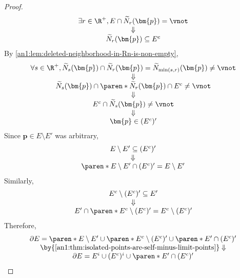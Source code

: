 \begin{proof}
\[\begin{array}{c}
      \exists r \in \R^{+}, E \cap \widetilde{N}_{r}(\bm{p}) = \vnot \\
      \Downarrow                                                     \\
      \widetilde{N}_{r}(\bm{p}) \subseteq E^{c}
    \end{array}
  \]
  By \cref{an1:lem:deleted-neighborhood-in-Rn-is-non-empty},
  \[
    \begin{array}{c}
      \forall s \in \R^{+}, \widetilde{N}_{s}(\bm{p}) \cap \widetilde{N}_{r}(\bm{p}) =
      \widetilde{N}_{\min(s,r)}(\bm{p}) \neq \vnot                                            \\
      \Downarrow                                                                              \\
      \widetilde{N}_{s}(\bm{p}) \cap \paren*{\widetilde{N}_{r}(\bm{p}) \cap E^{c}} \neq \vnot \\
      \Downarrow                                                                              \\
      E^{c} \cap \widetilde{N}_{s}(\bm{p}) \neq \vnot                                         \\
      \Downarrow                                                                              \\
      \bm{p} \in (E^{c})'
    \end{array}
  \]
  Since $\bm{p} \in E \setminus E'$ was arbitrary,
  \[
    \begin{array}{c}
      E \setminus E' \subseteq (E^{c})' \\
      \Downarrow                        \\
      \paren*{E \setminus E'} \cap (E^{c})' = E \setminus E'
    \end{array}
  \]
  Similarly,
  \[
    \begin{array}{c}
      E^{c} \setminus (E^{c})' \subseteq E' \\
      \Downarrow                            \\
      E' \cap \paren*{E^{c} \setminus (E^{c})'} = E^{c} \setminus (E^{c})'
    \end{array}
  \]
  Therefore,
  \[
    \begin{array}{c}
      \partial E = \paren*{E \setminus E'} \cup \paren*{E^{c} \setminus (E^{c})'} \cup \paren*{E' \cap (E^{c})'} \\
      \by{\Cref{an1:thm:isolated-points-are-self-minus-limit-points}} \Downarrow                                 \\
      \partial E = E^{i} \cup (E^{c})^{i} \cup \paren*{E' \cap (E^{c})'}
    \end{array}
  \]
\end{proof}

